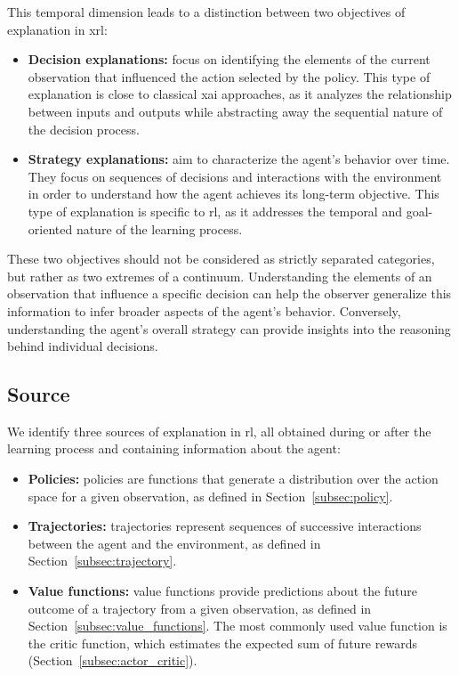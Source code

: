 This temporal dimension leads to a distinction between two objectives of explanation in \gls{xrl}:
\begin{itemize}
    \item \textbf{Decision explanations:} focus on identifying the elements of the current observation that influenced the action selected by the policy.
    This type of explanation is close to classical \gls{xai} approaches, as it analyzes the relationship between inputs and outputs while abstracting away the sequential nature of the decision process.

    \item \textbf{Strategy explanations:} aim to characterize the agent's behavior over time.
    They focus on sequences of decisions and interactions with the environment in order to understand how the agent achieves its long-term objective.
    This type of explanation is specific to \gls{rl}, as it addresses the temporal and goal-oriented nature of the learning process.
\end{itemize}

These two objectives should not be considered as strictly separated categories, but rather as two extremes of a continuum.
Understanding the elements of an observation that influence a specific decision can help the observer generalize this information to infer broader aspects of the agent's behavior.
Conversely, understanding the agent's overall strategy can provide insights into the reasoning behind individual decisions.

\subsection{Source}
\label{subsec:source}

We identify three sources of explanation in \gls{rl}, all obtained during or after the learning process and containing information about the agent:
\begin{itemize}
    \item \textbf{Policies:} policies are functions that generate a distribution over the action space for a given observation, as defined in Section~\ref{subsec:policy}.

    \item \textbf{Trajectories:} trajectories represent sequences of successive interactions between the agent and the environment, as defined in Section~\ref{subsec:trajectory}.

    \item \textbf{Value functions:} value functions provide predictions about the future outcome of a trajectory from a given observation, as defined in Section~\ref{subsec:value_functions}.
    The most commonly used value function is the critic function, which estimates the expected sum of future rewards (Section~\ref{subsec:actor_critic}).
\end{itemize}

